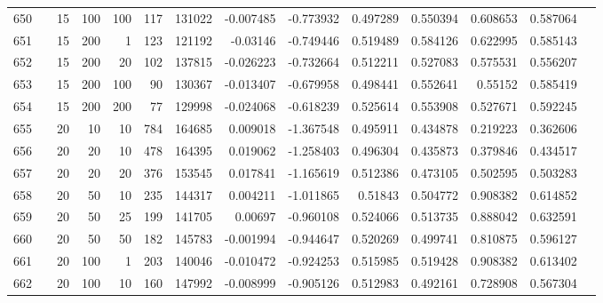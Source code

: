 \begin{longtable}{llrrrrrrrrrrrr}
		650 & &           15 &               100 &          100 &         117 &     131022 & -0.007485 & -0.773932 &  0.497289 &    0.550394 &       0.608653 &  0.587064 \\
		651 & &           15 &               200 &            1 &         123 &     121192 &  -0.03146 & -0.749446 &  0.519489 &    0.584126 &       0.622995 &  0.585143 \\
		652 & &           15 &               200 &           20 &         102 &     137815 & -0.026223 & -0.732664 &  0.512211 &    0.527083 &       0.575531 &  0.556207 \\
		653 & &           15 &               200 &          100 &          90 &     130367 & -0.013407 & -0.679958 &  0.498441 &    0.552641 &        0.55152 &  0.585419 \\
		654 & &           15 &               200 &          200 &          77 &     129998 & -0.024068 & -0.618239 &  0.525614 &    0.553908 &       0.527671 &  0.592245 \\
		655 & &           20 &                10 &           10 &         784 &     164685 &  0.009018 & -1.367548 &  0.495911 &    0.434878 &       0.219223 &  0.362606 \\
		656 & &           20 &                20 &           10 &         478 &     164395 &  0.019062 & -1.258403 &  0.496304 &    0.435873 &       0.379846 &  0.434517 \\
		657 & &           20 &                20 &           20 &         376 &     153545 &  0.017841 & -1.165619 &  0.512386 &    0.473105 &       0.502595 &  0.503283 \\
		658 & &           20 &                50 &           10 &         235 &     144317 &  0.004211 & -1.011865 &   0.51843 &    0.504772 &       0.908382 &  0.614852 \\
		659 & &           20 &                50 &           25 &         199 &     141705 &   0.00697 & -0.960108 &  0.524066 &    0.513735 &       0.888042 &  0.632591 \\
		660 & &           20 &                50 &           50 &         182 &     145783 & -0.001994 & -0.944647 &  0.520269 &    0.499741 &       0.810875 &  0.596127 \\
		661 & &           20 &               100 &            1 &         203 &     140046 & -0.010472 & -0.924253 &  0.515985 &    0.519428 &       0.908382 &  0.613402 \\
		662 & &           20 &               100 &           10 &         160 &     147992 & -0.008999 & -0.905126 &  0.512983 &    0.492161 &       0.728908 &  0.567304 \\

\end{longtable}
